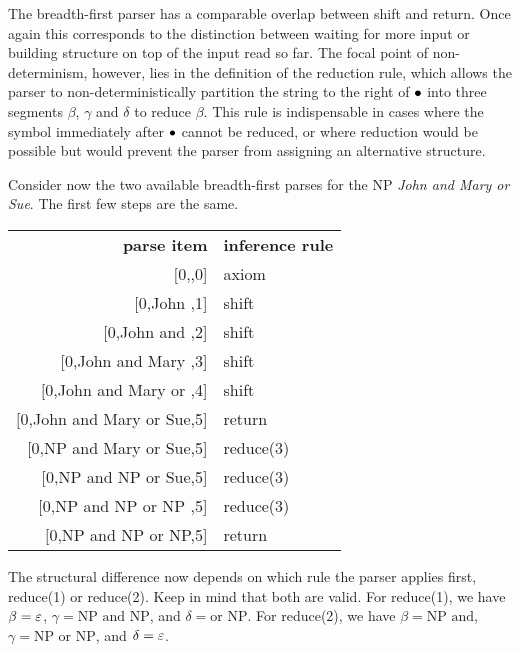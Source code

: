 The breadth-first parser has a comparable overlap between shift and return.
Once again this corresponds to the distinction between waiting for more input or building structure on top of the input read so far.
The focal point of non-determinism, however, lies in the definition of the reduction rule, which allows the parser to non-deterministically partition the string to the right of $\bullet$ into three segments $\beta$, $\gamma$ and $\delta$ to reduce $\beta$.
This rule is indispensable in cases where the symbol immediately after $\bullet$ cannot be reduced, or where reduction would be possible but would prevent the parser from assigning an alternative structure.
%
\begin{examplebox}
    Consider now the two available breadth-first parses for the NP \emph{John and Mary or Sue}.
    The first few steps are the same.
    \begin{center}
        \begin{tabular}{r|l}
            \textbf{parse item}             & \textbf{inference rule}\\
            $\lbrack$0,\psep,0] & axiom\\
            $\lbrack$0,John \psep,1] & shift\\
            $\lbrack$0,John and \psep,2] & shift\\
            $\lbrack$0,John and Mary \psep,3] & shift\\
            $\lbrack$0,John and Mary or \psep,4] & shift\\
            $\lbrack$0,\psep John and Mary or Sue,5] & return\\
            $\lbrack$0,NP \psep and Mary or Sue,5] & reduce(3)\\
            $\lbrack$0,NP and NP \psep or Sue,5] & reduce(3)\\
            $\lbrack$0,NP and NP or NP \psep,5] & reduce(3)\\
            $\lbrack$0,\psep NP and NP or NP,5] & return\\
        \end{tabular}
    \end{center}
    The structural difference now depends on which rule the parser applies first, reduce(1) or reduce(2). 
    Keep in mind that both are valid.
    For reduce(1), we have $\beta = \varepsilon$, $\gamma = \text{NP and NP}$, and $\delta = \text{or NP}$.
    For reduce(2), we have $\beta = \text{NP and}$, $\gamma = \text{NP or NP}$, and $\delta = \varepsilon$.

\end{examplebox}
